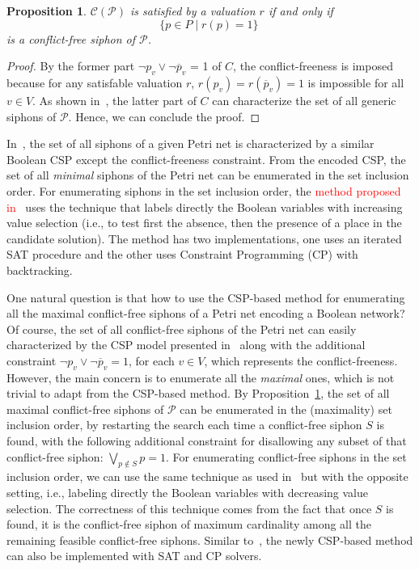 \documentclass[preprint,12pt]{elsarticle}
\newtheorem{proposition}{Proposition}[section]
\newcommand{\change}[1]{\textcolor{red}{#1}}
\begin{document}
\begin{proposition}%
\label{prop:csp_conflict_free_siphon}
  \(\mathcal{C}(\mathcal{P})\) is satisfied by a valuation \(r\) if and only if
  \[
    \{p \in P \;|\; r(p) = 1\}\
  \]
  is a conflict-free siphon of \(\mathcal{P}\).

\end{proposition}

\begin{proof}

  By the former part \(\neg p_v \vee \neg \overline{p}_v\) = 1 of \(C\), the conflict-freeness is imposed because for any satisfable valuation \(r\), \(r(p_v) = r(\overline{p}_v) = 1\) is impossible for all \(v \in V\).
  As shown in~\cite{nabli2016enumerating}, the latter part of \(C\) can characterize the set of all generic siphons of \(\mathcal{P}\).
  Hence, we can conclude the proof.

\end{proof}

In~\cite{nabli2016enumerating}, the set of all siphons of a given Petri net is characterized by a similar Boolean CSP except the conflict-freeness constraint.
From the encoded CSP, the set of all \emph{minimal} siphons of the Petri net can be enumerated in the set inclusion order.
For enumerating siphons in the set inclusion order, the \change{method proposed in}~\cite{nabli2016enumerating} uses the technique that labels directly the Boolean variables with increasing value selection (i.e., to test first the absence, then the presence of a place in the candidate solution).
The method has two implementations, one uses an iterated SAT procedure and the other uses Constraint Programming (CP) with backtracking.

One natural question is that how to use the CSP-based method for enumerating all the maximal conflict-free siphons of a Petri net encoding a Boolean network?
Of course, the set of all conflict-free siphons of the Petri net can easily characterized by the CSP model presented in~\cite{nabli2016enumerating} along with the additional constraint \(\neg p_v \vee \neg \overline{p}_v = 1\), for each \(v \in V\), which represents the conflict-freeness.
However, the main concern is to enumerate all the \emph{maximal} ones, which is not trivial to adapt from the CSP-based method.
By Proposition~\ref{prop:csp_conflict_free_siphon}, the set of all maximal conflict-free siphons of \(\mathcal{P}\) can be enumerated in the (maximality) set inclusion order, by restarting the search each time a conflict-free siphon \(S\) is found, with the following additional constraint for disallowing any subset of that conflict-free siphon: \(\bigvee_{p \not \in S} p = 1\).
For enumerating conflict-free siphons in the set inclusion order, we can use the same technique as used in~\cite{nabli2016enumerating} but with the opposite setting, i.e., labeling directly the Boolean variables with decreasing value selection.
The correctness of this technique comes from the fact that once \(S\) is found, it is the conflict-free siphon of maximum cardinality among all the remaining feasible conflict-free siphons.
Similar to~\cite{nabli2016enumerating}, the newly CSP-based method can also be implemented with SAT and CP solvers.
\end{document}
